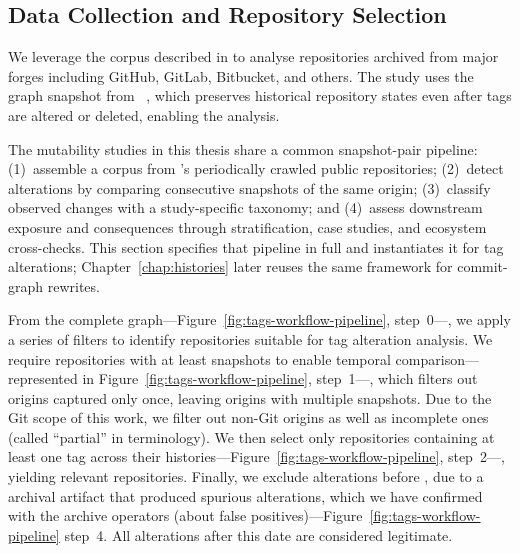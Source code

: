 \subsection{Data Collection and Repository Selection}
\label{subsec:tags-data-collection}

We leverage the \SWH corpus described in  to analyse repositories archived from major forges including GitHub, GitLab, Bitbucket, and others.
The study uses the \SWH graph snapshot from \DatasetDate~\cite{DBLP:conf/msr/PietriSZ20}, which preserves historical repository states even after tags are altered or deleted, enabling the analysis.

The mutability studies in this thesis share a common snapshot-pair pipeline: (1)~assemble a corpus from \SWH's periodically crawled public repositories; (2)~detect alterations by comparing consecutive snapshots of the same origin; (3)~classify observed changes with a study-specific taxonomy; and (4)~assess downstream exposure and consequences through stratification, case studies, and ecosystem cross-checks.
This section specifies that pipeline in full and instantiates it for tag alterations; Chapter~\ref{chap:histories} later reuses the same framework for commit-graph rewrites.

From the complete \SWH graph---Figure~\ref{fig:tags-workflow-pipeline}, step~0---, we apply a series of filters to identify repositories suitable for tag alteration analysis.
We require repositories with at least \MinSnapshotsRequired snapshots to enable temporal comparison---represented in Figure~\ref{fig:tags-workflow-pipeline}, step~1---, which filters out \OriginsFilteredOutShort origins captured only once, leaving \TotalOriginsAnalyzedShort origins with multiple snapshots.
Due to the Git scope of this work, we filter out non-Git origins as well as incomplete ones (called ``partial'' in \SWH terminology).
We then select only repositories containing at least one tag across their histories---Figure~\ref{fig:tags-workflow-pipeline}, step~2---, yielding \OriginsWithTagsShort relevant repositories.
Finally, we exclude alterations before \CutoffDate, due to a \SWH archival artifact that produced spurious alterations, which we have confirmed with the archive operators (about \NonLegitAlterationsShort false positives)---Figure~\ref{fig:tags-workflow-pipeline} step~4.
All alterations after this date are considered legitimate.

